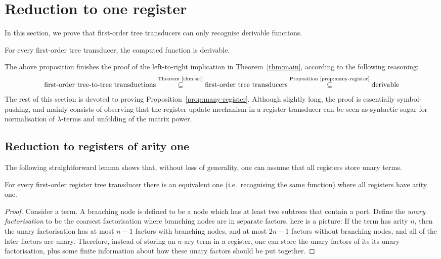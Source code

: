 \section{Reduction to one register}
\label{sec:matrix-power}
In this section, we prove that first-order  tree transducers can only recognise derivable functions. 
\begin{proposition}
    \label{prop:many-register} 
For every first-order  tree transducer, the computed function is derivable. 
\end{proposition}

The above proposition finishes the proof of the left-to-right implication in Theorem~\ref{thm:main}, according to the following reasoning:
\begin{align*}
\text{first-order tree-to-tree transductions}  \stackrel {\text{Theorem~\ref{thm:stt}}}\subseteq  \text{first-order tree transducers} \stackrel {\text{Proposition~\ref{prop:many-register}}} \subseteq \text{derivable}
\end{align*}
The rest of this section is devoted to proving Proposition~\ref{prop:many-register}. Although slightly long, the proof is essentially symbol-pushing, and mainly consists of observing that the register update mechanism in a register transducer can be seen as syntactic sugar for normalisation of $\lambda$-terms and unfolding of the matrix power. 




\subsection{Reduction to registers of arity one}
The following straightforward lemma shows that, without loss of generality, one can assume that all registers store unary terms. 
\begin{lemma}\label{lem:unary-registers}
    For every first-order register tree transducer there is an equivalent one (i.e.~recognising the same function) where all registers have arity one. 
\end{lemma}
\begin{proof}
    Consider a term. A branching node is defined to be a node which has at least two subtrees that contain a port. Define the  \emph{unary factorisation} to be the coarsest factorisation where branching nodes are in separate factors, here is a picture:
    If the term has arity $n$, then the unary factorisation has at most $n-1$ factors with branching nodes, and at most $2n-1$ factors without branching nodes, and all of the later factors are unary. Therefore, instead of storing an $n$-ary term in a register, one can store the unary factors of its its unary factorisation, plus some finite information about how these unary factors should be put together. 
\end{proof}
